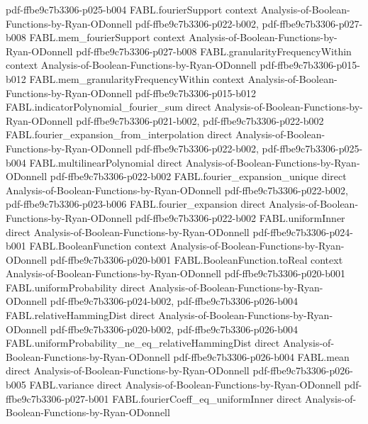 \begin{theorem}
  {pdf-ffbe9c7b3306-p025-b004}
\proofstep
  {FABL.fourierSupport}
  {context}
  {Analysis-of-Boolean-Functions-by-Ryan-ODonnell}
  {pdf-ffbe9c7b3306-p022-b002,
    pdf-ffbe9c7b3306-p027-b008}
\proofstep
  {FABL.mem_fourierSupport}
  {context}
  {Analysis-of-Boolean-Functions-by-Ryan-ODonnell}
  {pdf-ffbe9c7b3306-p027-b008}
\proofstep
  {FABL.granularityFrequencyWithin}
  {context}
  {Analysis-of-Boolean-Functions-by-Ryan-ODonnell}
  {pdf-ffbe9c7b3306-p015-b012}
\proofstep
  {FABL.mem_granularityFrequencyWithin}
  {context}
  {Analysis-of-Boolean-Functions-by-Ryan-ODonnell}
  {pdf-ffbe9c7b3306-p015-b012}
\proofstep
  {FABL.indicatorPolynomial_fourier_sum}
  {direct}
  {Analysis-of-Boolean-Functions-by-Ryan-ODonnell}
  {pdf-ffbe9c7b3306-p021-b002,
    pdf-ffbe9c7b3306-p022-b002}
\proofstep
  {FABL.fourier_expansion_from_interpolation}
  {direct}
  {Analysis-of-Boolean-Functions-by-Ryan-ODonnell}
  {pdf-ffbe9c7b3306-p022-b002,
    pdf-ffbe9c7b3306-p025-b004}
\proofstep
  {FABL.multilinearPolynomial}
  {direct}
  {Analysis-of-Boolean-Functions-by-Ryan-ODonnell}
  {pdf-ffbe9c7b3306-p022-b002}
\proofstep
  {FABL.fourier_expansion_unique}
  {direct}
  {Analysis-of-Boolean-Functions-by-Ryan-ODonnell}
  {pdf-ffbe9c7b3306-p022-b002,
    pdf-ffbe9c7b3306-p023-b006}
\proofstep
  {FABL.fourier_expansion}
  {direct}
  {Analysis-of-Boolean-Functions-by-Ryan-ODonnell}
  {pdf-ffbe9c7b3306-p022-b002}
\proofstep
  {FABL.uniformInner}
  {direct}
  {Analysis-of-Boolean-Functions-by-Ryan-ODonnell}
  {pdf-ffbe9c7b3306-p024-b001}
\proofstep
  {FABL.BooleanFunction}
  {context}
  {Analysis-of-Boolean-Functions-by-Ryan-ODonnell}
  {pdf-ffbe9c7b3306-p020-b001}
\proofstep
  {FABL.BooleanFunction.toReal}
  {context}
  {Analysis-of-Boolean-Functions-by-Ryan-ODonnell}
  {pdf-ffbe9c7b3306-p020-b001}
\proofstep
  {FABL.uniformProbability}
  {direct}
  {Analysis-of-Boolean-Functions-by-Ryan-ODonnell}
  {pdf-ffbe9c7b3306-p024-b002,
    pdf-ffbe9c7b3306-p026-b004}
\proofstep
  {FABL.relativeHammingDist}
  {direct}
  {Analysis-of-Boolean-Functions-by-Ryan-ODonnell}
  {pdf-ffbe9c7b3306-p020-b002,
    pdf-ffbe9c7b3306-p026-b004}
\proofstep
  {FABL.uniformProbability_ne_eq_relativeHammingDist}
  {direct}
  {Analysis-of-Boolean-Functions-by-Ryan-ODonnell}
  {pdf-ffbe9c7b3306-p026-b004}
\proofstep
  {FABL.mean}
  {direct}
  {Analysis-of-Boolean-Functions-by-Ryan-ODonnell}
  {pdf-ffbe9c7b3306-p026-b005}
\proofstep
  {FABL.variance}
  {direct}
  {Analysis-of-Boolean-Functions-by-Ryan-ODonnell}
  {pdf-ffbe9c7b3306-p027-b001}
\proofstep
  {FABL.fourierCoeff_eq_uniformInner}
  {direct}
  {Analysis-of-Boolean-Functions-by-Ryan-ODonnell}

\end{theorem}
